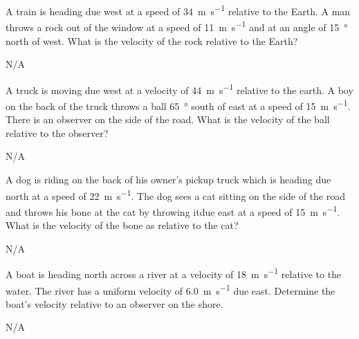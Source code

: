 \begin{question}[ID=relative-B-Q05,topic=relative-motion,difficulty=B]
    A train is heading due west at a speed of
        \SI{34}{\meter\per\second} relative to the Earth.
    A man throws a rock out of the window at a speed of
        \SI{11}{\meter\per\second} and at an angle of
        \SI{15}{\degree} north of west.
    What is the velocity of the rock relative to the Earth?
\end{question}
\begin{solution}
    N/A
\end{solution}


\begin{question}[ID=relative-B-Q06,topic=relative-motion,difficulty=B]
    A truck is moving due west at a velocity of \SI{44}{\meter\per\second}
        relative to the earth.
    A boy on the back of the truck throws a ball \SI{65}{\degree}
        south of east at a speed of \SI{15}{\meter\per\second}.
    There is an observer on the side of the road.
    What is the velocity of the ball relative to the observer?
\end{question}
\begin{solution}
    N/A
\end{solution}


\begin{question}[ID=relative-C-Q01,topic=relative-motion,difficulty=C]
    A dog is riding on the back of his owner's pickup truck which is
        heading due north at a speed of \SI{22}{\meter\per\second}.
    The dog sees a cat sitting on the side of the road and throws his
        bone at the cat by throwing itdue east at a speed of
        \SI{15}{\meter\per\second}.
    What is the velocity of the bone as relative to the cat?
\end{question}
\begin{solution}
    N/A
\end{solution}


\begin{question}[ID=relative-C-Q02,topic=relative-motion,difficulty=C]
    A boat is heading north across a river at a velocity of
        \SI{18}{\meter\per\second} relative to the water.
    The river has a uniform velocity of \SI{6.0}{\meter\per\second}
        due east.
    Determine the boat's velocity relative to an observer on the shore.
\end{question}
\begin{solution}
    N/A
\end{solution}


